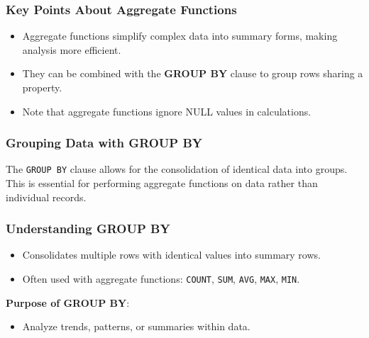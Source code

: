 \documentclass[aspectratio=169]{beamer}
\begin{document}
\begin{frame}[fragile]
    \frametitle{Key Points About Aggregate Functions}
    \begin{itemize}
        \item Aggregate functions simplify complex data into summary forms, making analysis more efficient.
        \item They can be combined with the \textbf{GROUP BY} clause to group rows sharing a property.
        \item Note that aggregate functions ignore NULL values in calculations.
    \end{itemize}
\end{frame}

\begin{frame}
    \frametitle{Grouping Data with GROUP BY}
    The \texttt{GROUP BY} clause allows for the consolidation of identical data into groups.
    This is essential for performing aggregate functions on data rather than individual records.
\end{frame}

\begin{frame}[fragile]
    \frametitle{Understanding GROUP BY}
    \begin{itemize}
        \item Consolidates multiple rows with identical values into summary rows.
        \item Often used with aggregate functions: \texttt{COUNT}, \texttt{SUM}, \texttt{AVG}, \texttt{MAX}, \texttt{MIN}.
    \end{itemize}
    
    \textbf{Purpose of GROUP BY}:
    \begin{itemize}
        \item Analyze trends, patterns, or summaries within data.
    \end{itemize}
\end{frame}
\end{document}
